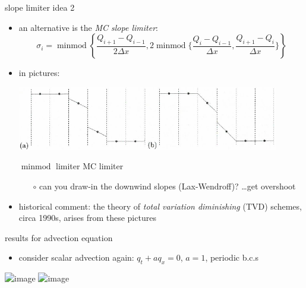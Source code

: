 \documentclass[10pt,dvipsnames,usepdftitle=false,
hyperref={pdftitle = {Finite volume methods},
    pdfauthor = {Ed Bueler}}]{beamer}
\newcommand{\minmod}{\operatorname{minmod}}
\begin{document}
\begin{frame}{slope limiter idea 2}

\begin{itemize}
\item an alternative is the \alert{\emph{MC slope limiter}:}
    $$\sigma_i = \minmod\left\{\frac{Q_{i+1}-Q_{i-1}}{2\Delta x},2\minmod\Big\{\frac{Q_i-Q_{i-1}}{\Delta x},\frac{Q_{i+1}-Q_i}{\Delta x}\Big\}\right\}$$
\item in pictures:

\begin{center}
\includegraphics[width=0.9\textwidth]{figs/leveque6p5}
\end{center}

\hspace{15mm} $\minmod$ limiter \hfill MC limiter \hspace{15mm} \phantom{x}

\medskip
    \begin{itemize}
    \item[$\circ$] can you draw-in the downwind slopes (Lax-Wendroff)?  \dots get overshoot
    \end{itemize}

\medskip
\footnotesize
\item historical comment: the theory of \emph{total variation diminishing} (TVD) schemes, circa 1990s, arises from these pictures
\end{itemize}
\end{frame}


\begin{frame}{results for advection equation}

\begin{itemize}
\item consider scalar advection again: $q_t + a q_x=0$, $a=1$, periodic b.c.s
\end{itemize}

\begin{center}
\includegraphics<1>[width=0.7\textwidth]{figs/leveque6p1} \includegraphics<2>[width=0.7\textwidth]{figs/leveque6p2}
\end{center}
\end{frame}
\end{document}
